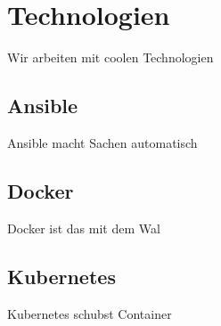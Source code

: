 \chapter{Technologien}\label{ch:technologien}

Wir arbeiten mit coolen Technologien

\section{Ansible}\label{sec:ansible}

Ansible macht Sachen automatisch

\section{Docker}\label{sec:docker}

Docker ist das mit dem Wal

\section{Kubernetes}\label{sec:kubernetes}

Kubernetes schubst Container

